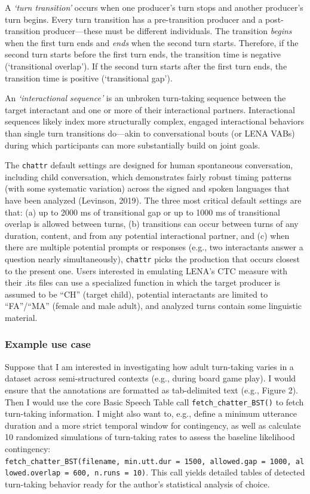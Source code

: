 \documentclass[10pt, letterpaper]{article}
\begin{document}
A \emph{`turn transition'} occurs when one producer's turn stops and
another producer's turn begins. Every turn transition has a
pre-transition producer and a post-transition producer---these must be
different individuals. The transition \emph{begins} when the first turn
ends and \emph{ends} when the second turn starts. Therefore, if the
second turn starts before the first turn ends, the transition time is
negative (`transitional overlap'). If the second turn starts after the
first turn ends, the transition time is positive (`transitional gap').

An \emph{`interactional sequence'} is an unbroken turn-taking sequence
between the target interactant and one or more of their interactional
partners. Interactional sequences likely index more structurally
complex, engaged interactional behaviors than single turn transitions
do---akin to conversational bouts (or LENA VABs) during which
participants can more substantially build on joint goals.

The \texttt{chattr} default settings are designed for human spontaneous
conversation, including child conversation, which demonstrates fairly
robust timing patterns (with some systematic variation) across the
signed and spoken languages that have been analyzed (Levinson, 2019).
The three most critical default settings are that: (a) up to 2000 ms of
transitional gap or up to 1000 ms of transitional overlap is allowed
between turns, (b) transitions can occur between turns of any duration,
content, and from any potential interactional partner, and (c) when
there are multiple potential prompts or responses (e.g., two
interactants answer a question nearly simultaneously), \texttt{chattr}
picks the production that occurs closest to the present one. Users
interested in emulating LENA's CTC measure with their .its files can use
a specialized function in which the target producer is assumed to be
``CH'' (target child), potential interactants are limited to
``FA''/``MA'' (female and male adult), and analyzed turns contain some
linguistic material.

\hypertarget{example-use-case}{%
\subsubsection{Example use case}\label{example-use-case}}

Suppose that I am interested in investigating how adult turn-taking
varies in a dataset across semi-structured contexts (e.g., during board
game play). I would ensure that the annotations are formatted as
tab-delimited text (e.g., Figure 2). Then I would use the core Basic
Speech Table call \texttt{fetch\_chatter\_BST()} to fetch turn-taking
information. I might also want to, e.g., define a minimum utterance
duration and a more strict temporal window for contingency, as well as
calculate 10 randomized simulations of turn-taking rates to assess the
baseline likelihood contingency:
\texttt{fetch\_chatter\_BST(filename,\ min.utt.dur\ =\ 1500,\ allowed.gap\ =\ 1000,\ allowed.overlap\ =\ 600,\ n.runs\ =\ 10)}.
This call yields detailed tables of detected turn-taking behavior ready
for the author's statistical analysis of choice.
\end{document}

